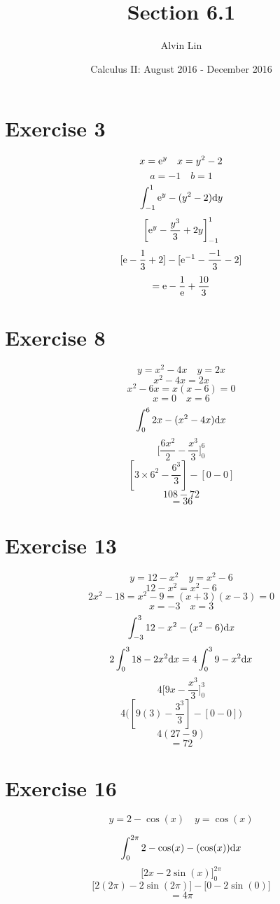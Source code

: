 \documentclass{math}
\title{Section 6.1}
\author{Alvin Lin}
\date{Calculus II: August 2016 - December 2016}
\begin{document}
\maketitle

\section*{Exercise 3}
\[ x = \mathrm{e}^{y} \quad x = y^{2}-2 \]
\[ a = -1 \quad b = 1 \]
\[ \int_{-1}^{1}{\mathrm{e}^{y}-(y^{2}-2)\mathrm{d}{y}} \]
\[ \bigg[\mathrm{e}^{y}-\frac{y^{3}}{3}+2y\bigg]_{-1}^{1} \]
\[ [\mathrm{e}-\frac{1}{3}+2]-[\mathrm{e}^{-1}-\frac{-1}{3}-2] \]
\[ = \mathrm{e}-\frac{1}{\mathrm{e}}+\frac{10}{3} \]

\section*{Exercise 8}
\[ y = x^{2}-4x \quad y = 2x \]
\[ x^{2}-4x = 2x \]
\[ x^{2}-6x = x(x-6) = 0 \]
\[ x = 0 \quad x = 6 \]
\[ \int_{0}^{6}{2x-(x^{2}-4x)\mathrm{d}{x}} \]
\[ \bigg[\frac{6x^{2}}{2}-\frac{x^{3}}{3}\bigg]_{0}^{6} \]
\[ [3\times6^{2}-\frac{6^{3}}{3}]-[0-0] \]
\[ 108-72 \]
\[ = 36 \]

\section*{Exercise 13}
\[ y = 12-x^{2} \quad y = x^{2}-6 \]
\[ 12-x^{2} = x^{2}-6 \]
\[ 2x^{2}-18 = x^{2}-9 = (x+3)(x-3) = 0 \]
\[ x = -3 \quad x = 3 \]
\[ \int_{-3}^{3}{12-x^{2}-(x^{2}-6)\mathrm{d}{x}} \]
\[ 2\int_{0}^{3}{18-2x^{2}\mathrm{d}{x}} = 4\int_{0}^{3}{9-x^{2}\mathrm{d}{x}} \]
\[ 4\bigg[9x-\frac{x^{3}}{3}\bigg]_{0}^{3} \]
\[ 4\bigg([9(3)-\frac{3^{3}}{3}]-[0-0]\bigg) \]
\[ 4(27-9) \]
\[ = 72 \]

\section*{Exercise 16}
\[ y = 2-\cos(x) \quad y = \cos(x) \]
\begin{center}
\end{center}
\[ \int_{0}^{2\pi}{2-\cos(x)-(\cos(x))\mathrm{d}{x}} \]
\[ \bigg[2x-2\sin(x)\bigg]_{0}^{2\pi} \]
\[ \bigg[2(2\pi)-2\sin(2\pi)\bigg]-\bigg[0-2\sin(0)\bigg] \]
\[ = 4\pi \]
\end{document}
